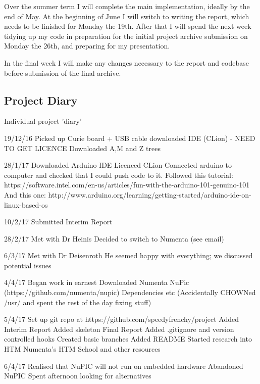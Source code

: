 \documentclass[a4paper]{article}
\begin{document}
Over the summer term I will complete the main implementation, ideally by the end of May. At the beginning of June I will switch to writing the report, which needs to be finished for Monday the 19th. After that I will spend the next week tidying up my code in preparation for the initial project archive submission on Monday the 26th, and preparing for my presentation. 

In the final week I will make any changes necessary to the report and codebase before submission of the final archive. 

\newpage
\subsection{Project Diary}%
\label{subsec:a3_pd}

Individual project 'diary'

19/12/16
    Picked up Curie board + USB cable
    downloaded IDE (CLion) - NEED TO GET LICENCE
    Downloaded A,M and Z trees

28/1/17
    Downloaded Arduino IDE
    Licenced CLion
    Connected arduino to computer and checked that I could push code to it.
        Followed this tutorial: https://software.intel.com/en-us/articles/fun-with-the-arduino-101-genuino-101
        And this one: http://www.arduino.org/learning/getting-started/arduino-ide-on-linux-based-os

10/2/17
    Submitted Interim Report

28/2/17
    Met with Dr Heinis
    Decided to switch to Numenta (see email)

6/3/17
    Met with Dr Deisenroth
    He seemed happy with everything; we discussed potential issues

4/4/17
    Began work in earnest
    Downloaded Numenta NuPic (https://github.com/numenta/nupic)
        Dependencies etc
    (Accidentally CHOWNed /usr/ and spent the rest of the day fixing stuff)

5/4/17
    Set up git repo at https://github.com/speedyfrenchy/project
        Added Interim Report
        Added skeleton Final Report
        Added .gitignore and version controlled hooks
        Created basic branches
        Added README        
    Started research into HTM
        Numenta's HTM School and other resources

6/4/17
    Realised that NuPIC will not run on embedded hardware
    Abandoned NuPIC
    Spent afternoon looking for alternatives
\end{document}
